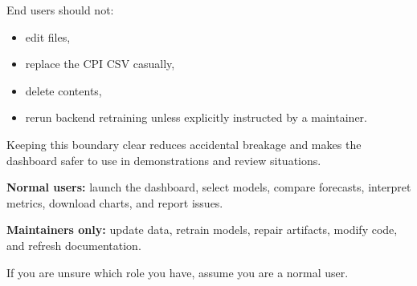 End users should not:

\begin{itemize}
    \item edit  files,
    \item replace the CPI CSV casually,
    \item delete  contents,
    \item rerun backend retraining unless explicitly instructed by a maintainer.
\end{itemize}

Keeping this boundary clear reduces accidental breakage and makes the dashboard safer to use in demonstrations and review situations.

\begin{tcolorbox}[colback=gray!10!white, colframe=gray!75!black, title=User vs Maintainer Boundary]
\textbf{Normal users:} launch the dashboard, select models, compare forecasts, interpret metrics, download charts, and report issues.

\textbf{Maintainers only:} update data, retrain models, repair artifacts, modify code, and refresh documentation.

If you are unsure which role you have, assume you are a normal user.
\end{tcolorbox}
